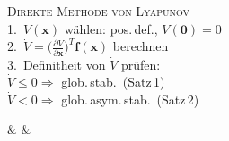 \begin{formelreihe}
  \parbox[t]{\linewidth}{%
    {\scriptsize\scshape\color{gray!65!black} Direkte Methode von Lyapunov}\\[0.03em]%
    1.\ $V(\mathbf{x})$ wählen: pos.\,def., $V(\mathbf{0})=0$\\[0.02em]
    2.\ $\dot{V}=\bigl(\tfrac{\partial V}{\partial\mathbf{x}}\bigr)^{\!T}\!\mathbf{f}(\mathbf{x})$ berechnen\\[0.02em]
    3.\ Definitheit von $\dot{V}$ prüfen:\\[0.01em]
    {\scriptsize
    \quad $\dot{V}\leq0\Rightarrow$ glob.\,stab.\ (Satz\,1)\\[0.01em]
    \quad $\dot{V}<0\Rightarrow$ glob.\,asym.\,stab.\ (Satz\,2)}} &
   &
   \\[0.3em]


\end{formelreihe}
